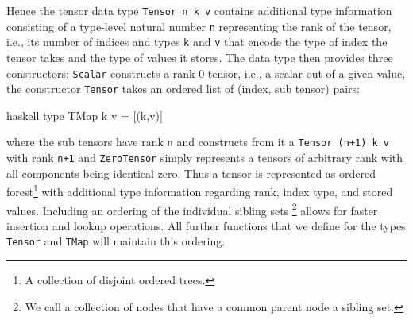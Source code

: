 Hence the tensor data type \texttt{Tensor n k v} contains additional type information consisting of a type-level natural number \texttt{n} representing the rank of the tensor, i.e., its number of indices and types \texttt{k} and \texttt{v} that encode the type of index the tensor takes and the type of values it stores. The data type then provides three constructors: \texttt{Scalar} constructs a rank 0 tensor, i.e., a scalar out of a given value, the constructor \texttt{Tensor} takes an ordered list of (index, sub tensor) pairs:
\begin{center}
\begin{cminted}{haskell}
type TMap k v = [(k,v)]
\end{cminted}
\end{center}
where the sub tensors have rank \texttt{n} and constructs from it a \texttt{Tensor (n+1) k v} with rank \texttt{n+1} and \texttt{ZeroTensor} simply represents a tensors of arbitrary rank with all components being identical zero. Thus a tensor is represented as ordered forest\footnote{A collection of disjoint ordered trees.} with additional type information regarding rank, index type, and stored values. Including an ordering of the individual sibling sets \footnote{We call a collection of nodes that have a common parent node a sibling set.} allows for faster insertion and lookup operations. All further functions that we define for the types \texttt{Tensor} and \texttt{TMap} will maintain this ordering.

